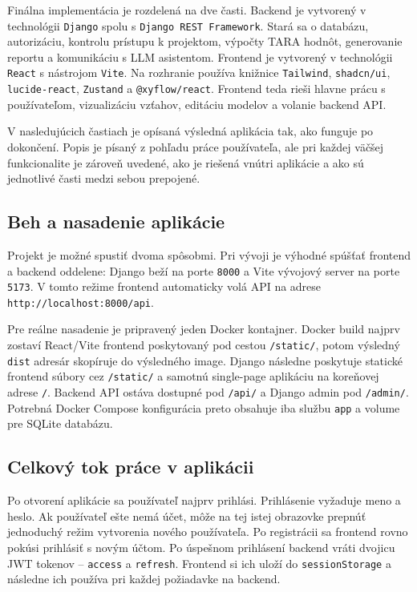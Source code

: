 \documentclass[11pt]{article}
\begin{document}
Finálna implementácia je rozdelená na dve časti. Backend je vytvorený v technológii \texttt{Django} spolu s \texttt{Django REST Framework}. Stará sa o databázu, autorizáciu, kontrolu prístupu k projektom, výpočty TARA hodnôt, generovanie reportu a komunikáciu s LLM asistentom. Frontend je vytvorený v technológii \texttt{React} s nástrojom \texttt{Vite}. Na rozhranie používa knižnice \texttt{Tailwind}, \texttt{shadcn/ui}, \texttt{lucide-react}, \texttt{Zustand} a \texttt{@xyflow/react}. Frontend teda rieši hlavne prácu s používateľom, vizualizáciu vzťahov, editáciu modelov a volanie backend API.

V nasledujúcich častiach je opísaná výsledná aplikácia tak, ako funguje po dokončení. Popis je písaný z pohľadu práce používateľa, ale pri každej väčšej funkcionalite je zároveň uvedené, ako je riešená vnútri aplikácie a ako sú jednotlivé časti medzi sebou prepojené.

\subsection{Beh a nasadenie aplikácie}

Projekt je možné spustiť dvoma spôsobmi. Pri vývoji je výhodné spúšťať frontend a backend oddelene: Django beží na porte \texttt{8000} a Vite vývojový server na porte \texttt{5173}. V tomto režime frontend automaticky volá API na adrese \texttt{http://localhost:8000/api}.

Pre reálne nasadenie je pripravený jeden Docker kontajner. Docker build najprv zostaví React/Vite frontend poskytovaný pod cestou \texttt{/static/}, potom výsledný \texttt{dist} adresár skopíruje do výsledného image. Django následne poskytuje statické frontend súbory cez \texttt{/static/} a samotnú single-page aplikáciu na koreňovej adrese \texttt{/}. Backend API ostáva dostupné pod \texttt{/api/} a Django admin pod \texttt{/admin/}. Potrebná Docker Compose konfigurácia preto obsahuje iba službu \texttt{app} a volume pre SQLite databázu.

\subsection{Celkový tok práce v aplikácii}

Po otvorení aplikácie sa používateľ najprv prihlási. Prihlásenie vyžaduje meno a heslo. Ak používateľ ešte nemá účet, môže na tej istej obrazovke prepnúť jednoduchý režim vytvorenia nového používateľa. Po registrácii sa frontend rovno pokúsi prihlásiť s novým účtom. Po úspešnom prihlásení backend vráti dvojicu JWT tokenov -- \texttt{access} a \texttt{refresh}. Frontend si ich uloží do \texttt{sessionStorage} a následne ich používa pri každej požiadavke na backend.
\end{document}
